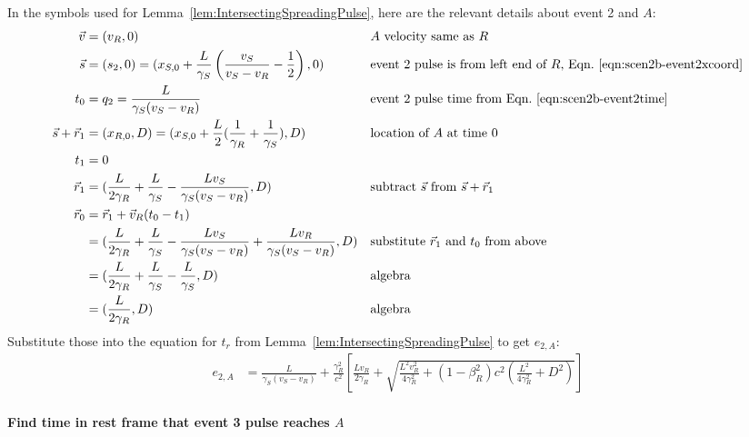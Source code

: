 \documentclass[a4paper]{article}
\theoremstyle{plain}
\theoremstyle{definition}
\newcommand{\vect}[1]{\vec{#1}}
\begin{document}
In the symbols used for Lemma~\ref{lem:IntersectingSpreadingPulse},
here are the relevant details about event 2 and $A$:
\begin{align*}
\vect{v} & = (v_R, 0) & & \text{$A$ velocity same as $R$} \\
\vect{s} & = (s_2,0) = (x_{S,0} + \frac{L}{\gamma_S} \left( \frac{v_S}{v_S - v_R} - \frac{1}{2} \right), 0) & & \text{event 2 pulse is from left end of $R$, Eqn.~\eqref{eqn:scen2b-event2xcoord}} \\
t_0 & = q_2 = \frac{L}{\gamma_S(v_S - v_R)} & & \text{event 2 pulse time from Eqn.~\eqref{eqn:scen2b-event2time}} \\
\vect{s} + \vect{r}_1 & = (x_{R,0}, D) = (x_{S,0} + \frac{L}{2} ( \frac{1}{\gamma_R} + \frac{1}{\gamma_S} ), D) & & \text{location of $A$ at time 0} \\
t_1 & = 0 \\
\vect{r}_1 & = (\frac{L}{2\gamma_R} + \frac{L}{\gamma_S} - \frac{Lv_S}{\gamma_S(v_S-v_R)}, D) & & \text{subtract $\vect{s}$ from $\vect{s}+\vect{r}_1$} \\
\vect{r}_0
  & = \vect{r}_1 + \vect{v}_R(t_0-t_1) \\
  & = (\frac{L}{2\gamma_R} + \frac{L}{\gamma_S} - \frac{Lv_S}{\gamma_S(v_S-v_R)} + \frac{Lv_R}{\gamma_S(v_S - v_R)}, D) & & \text{substitute $\vect{r}_1$ and $t_0$ from above} \\
  & = (\frac{L}{2\gamma_R} + \frac{L}{\gamma_S} - \frac{L}{\gamma_S}, D) & & \text{algebra} \\
  & = (\frac{L}{2\gamma_R}, D) & & \text{algebra}
\end{align*}
Substitute those into the equation for $t_r$ from
Lemma~\ref{lem:IntersectingSpreadingPulse} to get $e_{2,A}$:
\begin{align*}
e_{2,A} & = \frac{L}{\gamma_S(v_S - v_R)} + \frac{\gamma_R^2}{c^2} \left[ \frac{Lv_R}{2\gamma_R} + \sqrt{\frac{L^2v_R^2}{4\gamma_R^2} + (1-\beta_R^2)c^2 (\frac{L^2}{4\gamma_R^2} + D^2)} \right]
\end{align*}


\paragraph{Find time in rest frame that event 3 pulse reaches $A$}
\end{document}
